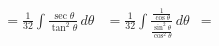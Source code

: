 \documentclass[preview]{standalone}
\begin{document}
\begin{align*}
&=\frac{1}{32} \int \frac{\sec\theta}{\tan^2\theta }\, d\theta&=\frac{1}{32} \int \frac{\frac{1}{\cos\theta}}{\frac{\sin^2\theta}{\cos^2\theta}} \, d\theta&=
\end{align*}
\end{document}
